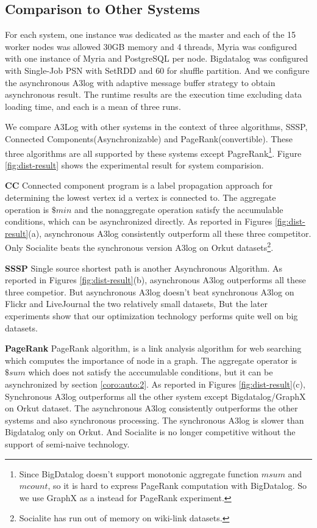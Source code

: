 \subsection{Comparison to Other Systems}




For each system, one instance was dedicated as the master and each of the 15 worker nodes was allowed 30GB memory and 4 threads, Myria was configured with one instance of Myria and PostgreSQL per node. Bigdatalog was configured with Single-Job PSN with SetRDD and 60 for shuffle partition. And we configure the asynchronous A3log with adaptive message buffer strategy to obtain asynchronous result. The runtime results are the execution time excluding data loading time, and each is a mean of three runs.

We compare A3Log with other systems in the context of three algorithms, SSSP, Connected Components(Asynchronizable) and PageRank(convertible). These three algorithms are all supported by these systems except PagreRank\footnote{Since BigDatalog doesn't support monotonic aggregate function $msum$ and $mcount$, so it is hard to express PageRank computation with BigDatalog. So we use GraphX as a instead for PageRank experiment.}. Figure \ref{fig:dist-result} shows the experimental result for system comparision. 

\textbf{CC} Connected component program is a label propagation approach for determining the lowest vertex id a vertex is connected to. The aggregate operation is $\$min$ and the nonaggregate operation satisfy the accumulable conditions, which can be asynchronized directly. As reported in Figures \ref{fig:dist-result}(a), asynchronous A3log consistently outperform all these three competitor. Only Socialite beats the synchronous version A3log on Orkut datasets\footnote{Socialite has run out of memory on wiki-link datasets.}. 

\textbf{SSSP} Single source shortest path is another Asynchronous Algorithm. As reported in Figures \ref{fig:dist-result}(b), asynchronous A3log outperforms all these three competior. But asynchronous A3log doesn't beat synchronous A3log on Flickr and LiveJournal the two relatively small datasets, But the later experiments show that our optimization technology performs quite well on big datasets.

\textbf{PageRank} PageRank algorithm, is a link analysis algorithm for web searching which computes the importance of node in a graph. The aggregate operator is $\$sum$ which does not satisfy the acccumulable conditions, but it can be  asynchronized by section \ref{coro:auto:2}. As reported in Figures \ref{fig:dist-result}(c), Synchronous A3log outperforms all the other system except Bigdatalog/GraphX on Orkut dataset. The asynchronous A3log consistently outperforms the other systems and also synchronous processing. The synchronous A3log is slower than Bigdatalog only on Orkut. And Socialite is no longer competitive without the support of semi-naive technology.

